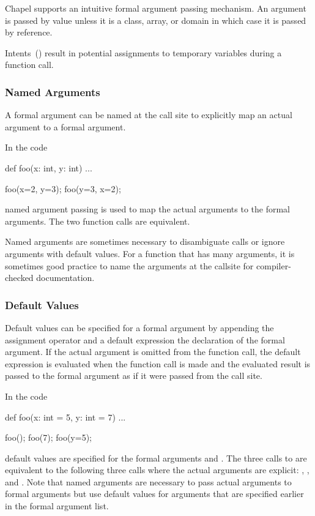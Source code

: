Chapel supports an intuitive formal argument passing mechanism.  An
argument is passed by value unless it is a class, array, or domain in
which case it is passed by reference.

Intents~() result in potential assignments to temporary
variables during a function call.

\subsubsection{Named Arguments}
\label{Named_Arguments}

A formal argument can be named at the call site to explicitly map an
actual argument to a formal argument.

\begin{example}
In the code
\begin{chapel}
def foo(x: int, y: int) { ... }

foo(x=2, y=3);
foo(y=3, x=2);
\end{chapel}
named argument passing is used to map the actual arguments to the
formal arguments.  The two function calls are equivalent.
\end{example}

Named arguments are sometimes necessary to disambiguate calls or
ignore arguments with default values.  For a function that has many
arguments, it is sometimes good practice to name the arguments at the
callsite for compiler-checked documentation.

\subsubsection{Default Values}
\label{Default_Values}

Default values can be specified for a formal argument by appending the
assignment operator and a default expression the declaration of the
formal argument.  If the actual argument is omitted from the function
call, the default expression is evaluated when the function call is
made and the evaluated result is passed to the formal argument as if
it were passed from the call site.

\begin{example}
In the code
\begin{chapel}
def foo(x: int = 5, y: int = 7) { ... }

foo();
foo(7);
foo(y=5);
\end{chapel}
default values are specified for the formal arguments 
and .  The three calls to  are equivalent to the
following three calls where the actual arguments are
explicit: , , and .
Note that named arguments are necessary to pass actual arguments to
formal arguments but use default values for arguments that are
specified earlier in the formal argument list.
\end{example}

